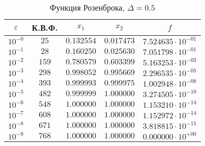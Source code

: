 \documentclass[a4paper,12pt,notitlepage,pdftex,headsepline]{scrartcl}
\begin{document}
        \begin{table}[ht]
          \centering
          \caption{Функция Розенброка, $\Delta = 0.5$}
          \begin{tabular}{|c|c|c|c|c|}
            \hline
            $\varepsilon$ & К.В.Ф. & $x_1$ & $x_2$ & $f$\\
            \hline
            $10^{-0}$ & $25$ & $0.132554$ & $0.017473$ & $7.524635\cdot 10^{-01}$\\
            $10^{-1}$ & $28$ & $0.160250$ & $0.025630$ & $7.051798\cdot 10^{-01}$\\
            $10^{-2}$ & $159$ & $0.780579$ & $0.603399$ & $5.163253\cdot 10^{-02}$\\
            $10^{-3}$ & $298$ & $0.998052$ & $0.995669$ & $2.296535\cdot 10^{-05}$\\
            $10^{-4}$ & $393$ & $0.999993$ & $0.999975$ & $1.002948\cdot 10^{-08}$\\
            $10^{-5}$ & $482$ & $0.999999$ & $1.000000$ & $3.274505\cdot 10^{-10}$\\
            $10^{-6}$ & $548$ & $1.000000$ & $1.000000$ & $1.153210\cdot 10^{-14}$\\
            $10^{-7}$ & $608$ & $1.000000$ & $1.000000$ & $1.152972\cdot 10^{-14}$\\
            $10^{-8}$ & $671$ & $1.000000$ & $1.000000$ & $3.818815\cdot 10^{-15}$\\
            $10^{-9}$ & $768$ & $1.000000$ & $1.000000$ & $0.000000\cdot 10^{+00}$\\
            \hline
          \end{tabular}
        \end{table}
\end{document}
